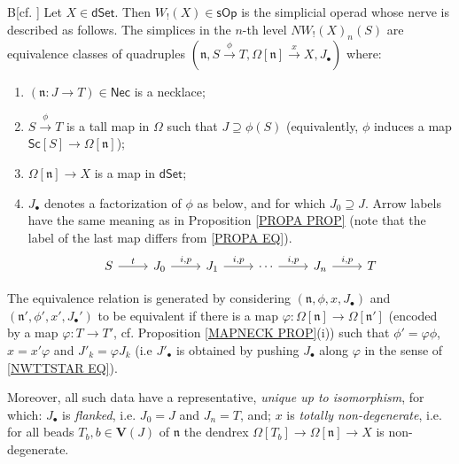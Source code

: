 \documentclass[a4paper,10pt
,draft
]{article}%
\numberwithin{equation}{section}
\numberwithin{figure}{section}
\theoremstyle{definition} %
\newcommand{\sOp}{\ensuremath{\mathsf{sOp}}}%
\newcommand{\1}{\ensuremath{\mathbbm 1}}%
\begin{document}
\begin{customthm}{B}[{cf. \cite[Thm. 1.3 and Cor. 4.4]{DS11}}]
	\label{THMB}
	Let $X\in \mathsf{dSet}$.
%
	Then $W_!(X) \in \sOp$ is the simplicial operad whose 
	nerve is described as follows.
%	
	The simplices in the $n$-th level
	$NW_!(X)_{n}(S)$
	are equivalence classes of quadruples
	$(\mathfrak{n}, S \xrightarrow{\phi} T, \Omega[\mathfrak{n}] \xrightarrow{x} X, J_{\bullet})$ 
	where:
\begin{enumerate}[label=(\roman*)]
	\item $(\mathfrak{n}\colon J \to T) \in \mathsf{Nec}$ is a necklace; 
	\item $S \xrightarrow{\phi} T$
		is a tall map in $\Omega$
		such that $J \supseteq \phi(S)$
		(equivalently, $\phi$ induces a map
		$\mathsf{Sc}[S] \to \Omega[\mathfrak{n}]$);		
	\item $\Omega[ \mathfrak{n}] \to X$ is a map in $\mathsf{dSet}$;
	\item $J_{\bullet}$ denotes a 
		factorization of $\phi$ as below,
		and for which $J_0 \supseteq J$.
		Arrow labels have the same meaning as in 
		Proposition \ref{PROPA PROP}
		(note that the label of the last map differs from
		\eqref{PROPA EQ}).
\begin{equation}
\begin{tikzcd}
	S \ar{r}{t}
&
	J_0 \ar{r}{i,p}
&
	J_1 \ar{r}{i,p}
	&
\cdots
	\ar{r}{i,p}
&
	J_n \ar{r}{i,p}
&
	T
\end{tikzcd}
\end{equation}
\end{enumerate}
	The equivalence relation is generated by considering 
	$(\mathfrak{n},\phi,x,J_{\bullet})$ and
	$(\mathfrak{n}',\phi',x',J_{\bullet}')$
	to be equivalent if there is
	a map
	$\varphi \colon \Omega[\mathfrak{n}] \to \Omega[\mathfrak{n}']$
	(encoded by a map $\varphi \colon T \to T'$,
	 cf. Proposition \ref{MAPNECK PROP}(i))
	such that
	$\phi' = \varphi \phi$,
	$x = x' \varphi $
	and
	$J'_k = \varphi J_k$
	(i.e $J'_{\bullet}$
	is obtained by pushing 
	$J_{\bullet}$ along $\varphi$
	in the sense of \eqref{NWTTSTAR EQ}).
	
	Moreover, all such data have a representative, 
	\emph{unique up to isomorphism},
	for which:
	$J_{\bullet}$ is \emph{flanked},
	i.e. $J_0=J$ and $J_n=T$,
	and;
	$x$ is \emph{totally non-degenerate},
	i.e. for all beads 
	$T_b, b \in \boldsymbol{V}(J)$ of 
	$\mathfrak{n}$
	the dendrex
	$\Omega[T_b] \to \Omega[\mathfrak{n}] \to X$
	is non-degenerate. 
\end{customthm}
\end{document}
